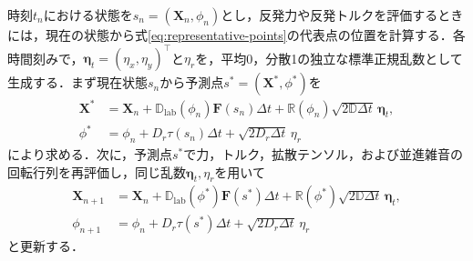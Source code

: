 \documentclass[dvipdfmx]{ampbt}
\begin{document}
  時刻$t_n$における状態を$s_n=(\bm{X}_n,\phi_n)$とし，反発力や反発トルクを評価するときには，現在の状態から式\eqref{eq:representative-points}の代表点の位置を計算する．各時間刻みで，$\bm{\eta}_t=(\eta_x,\eta_y)^\top$と$\eta_r$を，平均0，分散1の独立な標準正規乱数として生成する．まず現在状態$s_n$から予測点$s^\ast=(\bm{X}^\ast,\phi^\ast)$を
  \begin{align}
    \bm{X}^\ast
     & =
    \bm{X}_n
    +\mathbb{D}_{\mathrm{lab}}(\phi_n)\bm{F}(s_n)\Delta t
    +\mathbb{R}(\phi_n)\sqrt{2\mathbb{D}\Delta t}\,\bm{\eta}_t,
    \label{eq:predictor-x} \\
    \phi^\ast
     & =
    \phi_n
    +D_r\tau(s_n)\Delta t
    +\sqrt{2D_r\Delta t}\,\eta_r
    \label{eq:predictor-phi}
  \end{align}
  により求める．次に，予測点$s^\ast$で力，トルク，拡散テンソル，および並進雑音の回転行列を再評価し，同じ乱数$\bm{\eta}_t,\eta_r$を用いて
  \begin{align}
    \bm{X}_{n+1}
     & =
    \bm{X}_n
    +\mathbb{D}_{\mathrm{lab}}(\phi^\ast)\bm{F}(s^\ast)\Delta t
    +\mathbb{R}(\phi^\ast)\sqrt{2\mathbb{D}\Delta t}\,\bm{\eta}_t,
    \label{eq:corrector-x} \\
    \phi_{n+1}
     & =
    \phi_n
    +D_r\tau(s^\ast)\Delta t
    +\sqrt{2D_r\Delta t}\,\eta_r
    \label{eq:corrector-phi}
  \end{align}
  と更新する．
\end{document}
